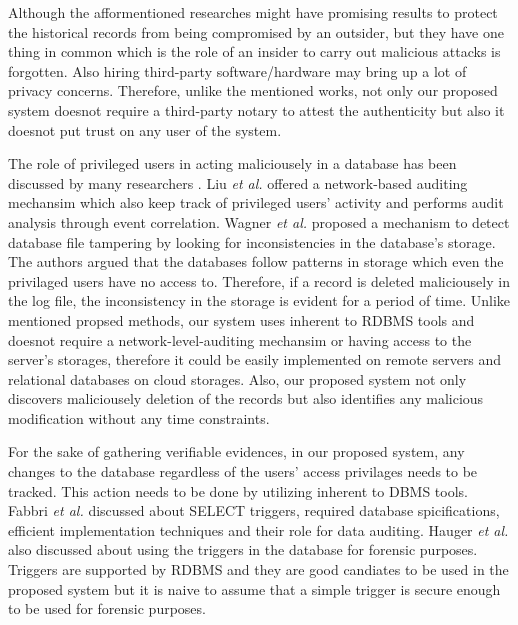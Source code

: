 Although the afformentioned researches might have promising results to protect the historical records from being compromised by an outsider, but they have one thing in common which is the role of an insider to carry out malicious attacks is forgotten. Also hiring third-party software/hardware may bring up a lot of privacy concerns. Therefore, unlike the mentioned works, not only our proposed system doesnot require a third-party notary to attest the authenticity but also it doesnot put trust on any user of the system.

The role of privileged users in acting maliciousely in a database has been discussed by many researchers \cite{crosby2009tamper-evident} \cite{wagner2018detect}. Liu {\it et al.} offered a network-based auditing mechansim which also keep track of privileged users' activity and performs audit analysis through event correlation. Wagner {\it et al.} \cite{wanger2017carving} proposed a mechanism to detect database file tampering by looking for inconsistencies in the database's storage. The authors argued that the databases follow patterns in storage which even the privilaged users have no access to. Therefore, if a record is deleted maliciousely in the log file, the inconsistency in the storage is evident for a period of time. Unlike mentioned propsed methods, our system uses inherent to RDBMS tools and doesnot require a network-level-auditing mechansim or having access to the server's storages, therefore it could be easily implemented on remote servers and relational databases on cloud storages. Also, our proposed system not only discovers maliciousely deletion of the records but also identifies any malicious modification without any time constraints.

For the sake of gathering verifiable evidences, in our proposed system, any changes to the database regardless of the users' access privilages needs to be tracked. This action needs to be done by utilizing inherent to DBMS tools. Fabbri {\it et al.} \cite{fabbri2013select} discussed about SELECT triggers, required database spicifications, efficient implementation techniques and their role for data auditing. Hauger {\it et al.}\cite{hauger2014information} also discussed about using the triggers in the database for forensic purposes. Triggers are supported by RDBMS and they are good candiates to be used in the proposed system but it is naive to assume that a simple trigger is secure enough to be used for forensic purposes.

